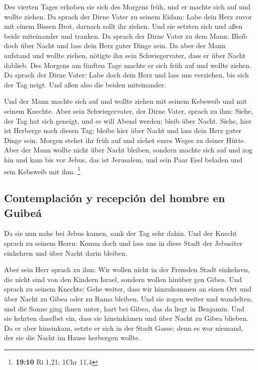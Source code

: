  Des vierten Tages erhoben sie sich des Morgens früh, und
er machte sich auf und wollte ziehen. Da sprach der Dirne Vater zu
seinem Eidam: Labe dein Herz zuvor mit einem Bissen Brot, darnach sollt
ihr ziehen.  Und sie setzten sich und aßen beide
miteinander und tranken. Da sprach der Dirne Vater zu dem Mann: Bleib
doch über Nacht und lass dein Herz guter Dinge sein.  Da
aber der Mann aufstand und wollte ziehen, nötigte ihn sein
Schwiegervater, dass er über Nacht dablieb.  Des Morgens
am fünften Tage machte er sich früh auf und wollte ziehen. Da sprach der
Dirne Vater: Labe doch dein Herz und lass uns verziehen, bis sich der
Tag neigt. Und aßen also die beiden miteinander.

 Und der Mann machte sich auf und wollte ziehen mit seinem
Kebsweib und mit seinem Knechte. Aber sein Schwiegervater, der Dirne
Vater, sprach zu ihm: Siehe, der Tag hat sich geneigt, und es will Abend
werden; bleib über Nacht. Siehe, hier ist Herberge noch diesen Tag;
bleibe hier über Nacht und lass dein Herz guter Dinge sein. Morgen
stehet ihr früh auf und ziehet eures Weges zu deiner Hütte.
 Aber der Mann wollte nicht über Nacht bleiben, sondern
machte sich auf und zog hin und kam bis vor Jebus, das ist Jerusalem,
und sein Paar Esel beladen und sein Kebsweib mit ihm. \footnote{\textbf{19:10}
  Ri 1,21; 1Chr 11,4}

\hypertarget{contemplaciuxf3n-y-recepciuxf3n-del-hombre-en-guibeuxe1}{%
\subsection{Contemplación y recepción del hombre en
Guibeá}\label{contemplaciuxf3n-y-recepciuxf3n-del-hombre-en-guibeuxe1}}

 Da sie nun nahe bei Jebus kamen, sank der Tag sehr
dahin. Und der Knecht sprach zu seinem Herrn: Komm doch und lass uns in
diese Stadt der Jebusiter einkehren und über Nacht darin bleiben.

 Aber sein Herr sprach zu ihm: Wir wollen nicht in der
Fremden Stadt einkehren, die nicht sind von den Kindern Israel, sondern
wollen hinüber gen Gibea.  Und sprach zu seinem Knechte:
Gehe weiter, dass wir hinzukommen an einen Ort und über Nacht zu Gibea
oder zu Rama bleiben.  Und sie zogen weiter und
wandelten, und die Sonne ging ihnen unter, hart bei Gibea, das da liegt
in Benjamin.  Und sie kehrten daselbst ein, dass sie
hineinkämen und über Nacht zu Gibea blieben. Da er aber hineinkam,
setzte er sich in der Stadt Gasse; denn es war niemand, der sie die
Nacht im Hause herbergen wollte.

